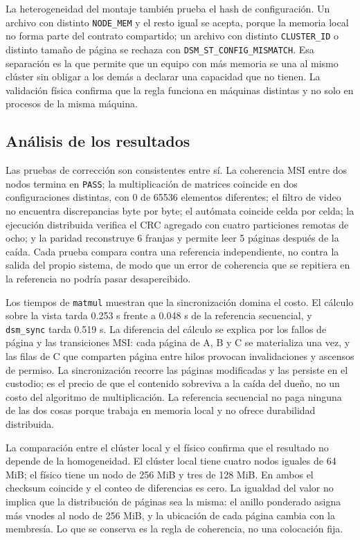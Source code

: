 La heterogeneidad del montaje también prueba el hash de configuración. Un archivo con distinto \texttt{NODE\_MEM} y el resto igual se acepta, porque la memoria local no forma parte del contrato compartido; un archivo con distinto \texttt{CLUSTER\_ID} o distinto tamaño de página se rechaza con \texttt{DSM\_ST\_CONFIG\_MISMATCH}. Esa separación es la que permite que un equipo con más memoria se una al mismo clúster sin obligar a los demás a declarar una capacidad que no tienen. La validación física confirma que la regla funciona en máquinas distintas y no solo en procesos de la misma máquina.

\subsection{Análisis de los resultados}

Las pruebas de corrección son consistentes entre sí. La coherencia MSI entre dos nodos termina en \texttt{PASS}; la multiplicación de matrices coincide en dos configuraciones distintas, con 0 de 65536 elementos diferentes; el filtro de video no encuentra discrepancias byte por byte; el autómata coincide celda por celda; la ejecución distribuida verifica el CRC agregado con cuatro particiones remotas de ocho; y la paridad reconstruye 6 franjas y permite leer 5 páginas después de la caída. Cada prueba compara contra una referencia independiente, no contra la salida del propio sistema, de modo que un error de coherencia que se repitiera en la referencia no podría pasar desapercibido.

Los tiempos de \texttt{matmul} muestran que la sincronización domina el costo. El cálculo sobre la vista tarda 0.253 s frente a 0.048 s de la referencia secuencial, y \texttt{dsm\_sync} tarda 0.519 s. La diferencia del cálculo se explica por los fallos de página y las transiciones MSI: cada página de A, B y C se materializa una vez, y las filas de C que comparten página entre hilos provocan invalidaciones y ascensos de permiso. La sincronización recorre las páginas modificadas y las persiste en el custodio; es el precio de que el contenido sobreviva a la caída del dueño, no un costo del algoritmo de multiplicación. La referencia secuencial no paga ninguna de las dos cosas porque trabaja en memoria local y no ofrece durabilidad distribuida.

La comparación entre el clúster local y el físico confirma que el resultado no depende de la homogeneidad. El clúster local tiene cuatro nodos iguales de 64 MiB; el físico tiene un nodo de 256 MiB y tres de 128 MiB. En ambos el checksum coincide y el conteo de diferencias es cero. La igualdad del valor no implica que la distribución de páginas sea la misma: el anillo ponderado asigna más vnodes al nodo de 256 MiB, y la ubicación de cada página cambia con la membresía. Lo que se conserva es la regla de coherencia, no una colocación fija.

